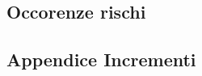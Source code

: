 \setcounter{secnumdepth}{0}
\subsection{Occorenze rischi}

\vspace{30pt}
\subsection{Appendice Incrementi}



